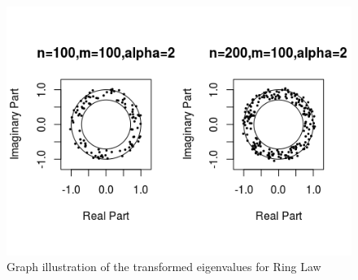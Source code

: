 \documentclass[12pt]{article}
\theoremstyle{plain}
\theoremstyle{definition}
\theoremstyle{remark}
\begin{document}
\begin{figure}
    \centering
    \includegraphics[width=150mm,scale=0.6]{Ring law.png}
    \caption{Graph illustration of the transformed eigenvalues for Ring Law}
    \label{fig:alpha=2}
\end{figure}




\end{document}
